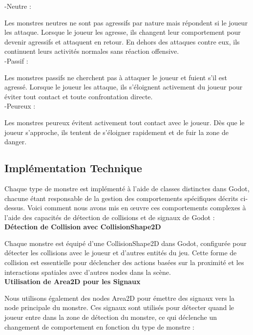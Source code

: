       -Neutre :

      Les monstres neutres ne sont pas agressifs par nature mais répondent si le joueur les attaque.
      Lorsque le joueur les agresse, ils changent leur comportement pour devenir agressifs et attaquent en retour.
      En dehors des attaques contre eux, ils continuent leurs activités normales sans réaction offensive.
      \\

      -Passif :

      Les monstres passifs ne cherchent pas à attaquer le joueur et fuient s'il est agressé.
      Lorsque le joueur les attaque, ils s'éloignent activement du joueur pour éviter tout contact et toute confrontation directe.
      \\

      -Peureux :

      Les monstres peureux évitent activement tout contact avec le joueur.
      Dès que le joueur s'approche, ils tentent de s'éloigner rapidement et de fuir la zone de danger.


      \subsection*{Implémentation Technique}
      Chaque type de monstre est implémenté à l'aide de classes distinctes dans Godot, 
      chacune étant responsable de la gestion des comportements spécifiques décrits ci-dessus.
      Voici comment nous avons mis en œuvre ces comportements complexes à l'aide des capacités de détection de collisions et de signaux de Godot :
      \\

      \textbf{Détection de Collision avec CollisionShape2D}

      Chaque monstre est équipé d'une CollisionShape2D dans Godot, configurée pour détecter les collisions avec le joueur et d'autres entités du jeu. 
      Cette forme de collision est essentielle pour déclencher des actions basées sur la proximité et les interactions spatiales avec d'autres nodes dans la scène.
      \\

      \textbf{Utilisation de Area2D pour les Signaux}

      Nous utilisons également des nodes Area2D pour émettre des signaux vers la node principale du monstre.
      Ces signaux sont utilisés pour détecter quand le joueur entre dans la zone de détection du monstre, 
      ce qui déclenche un changement de comportement en fonction du type de monstre :
      \\


